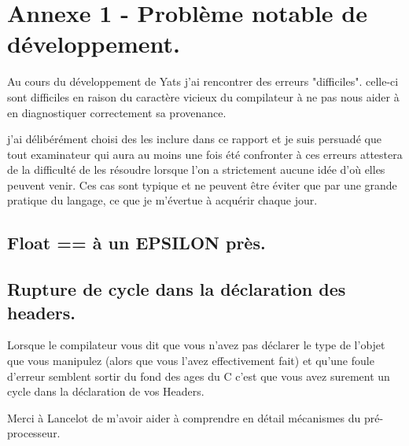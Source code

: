 \documentclass[a4paper,11pt]{article}
\begin{document}
\newpage

{}

\newpage
\section*{Annexe 1 - Problème notable de développement.}

Au cours du développement de Yats j'ai rencontrer des erreurs "difficiles". celle-ci sont difficiles en raison du caractère vicieux du compilateur à ne pas nous aider à en diagnostiquer correctement sa provenance. 

j'ai délibérément choisi des les inclure dans ce rapport et je suis persuadé que tout examinateur qui aura au moins une fois été confronter à ces erreurs attestera de la difficulté de les résoudre lorsque l'on a strictement aucune idée d'où elles peuvent venir. Ces cas sont typique et ne peuvent être éviter que par une grande pratique du langage, ce que je m'évertue à acquérir chaque jour.

\subsection{Float == à un EPSILON près.}

\subsection{Rupture de cycle dans la déclaration des headers.}

Lorsque le compilateur vous dit que vous n'avez pas déclarer le type de l'objet que vous manipulez (alors que vous l'avez effectivement fait) et qu'une foule d'erreur semblent sortir du fond des ages du C c'est que vous avez surement un cycle dans la déclaration de vos Headers. 

Merci à Lancelot de m'avoir aider à comprendre en détail mécanismes du pré-processeur. 
\end{document}
